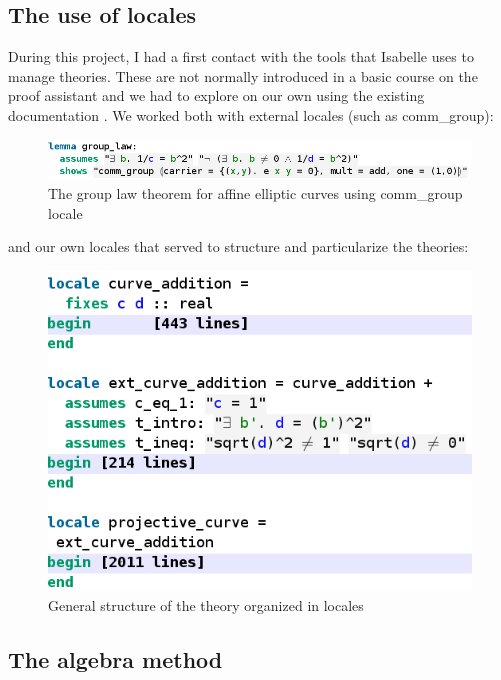 \subsection{The use of locales}

During this project, I had a first contact with the tools that Isabelle uses to manage theories. These are not normally introduced in a basic course on the proof assistant and we had to explore on our own using the existing documentation \cite{ballarin2010tutorial}. We worked both with external locales (such as comm\_group):

\begin{figure}[!htbp]
	\centering
	\includegraphics[width=\linewidth,height=\textheight,keepaspectratio]{img/group_law.png}
	\caption{The group law theorem for affine elliptic curves using comm\_group locale}
	\label{fig:grouplaw}
\end{figure}

and our own locales that served to structure and particularize the theories:

\begin{figure}[!htbp]
	\centering
	\includegraphics[width=0.8\linewidth,height=0.8\textheight,keepaspectratio]{img/structure.png}
	\caption{General structure of the theory organized in locales}
	\label{fig:grouplaw}
\end{figure}
	
\subsection{The algebra method}

